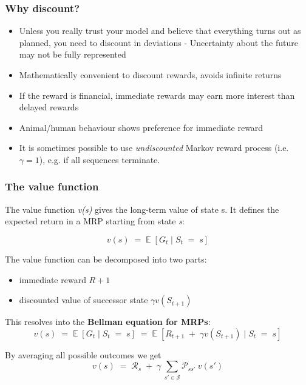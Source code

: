 \documentclass[10pt]{article}
\begin{document}
\subsubsection*{Why discount?}
\begin{itemize}
\item Unless you really trust your model and believe that everything turns out as planned, you need to discount in deviations - Uncertainty about the future may not be fully represented
\item Mathematically convenient to discount rewards, avoids infinite returns
\item If the reward is financial, immediate rewards may earn more interest than delayed rewards
\item Animal/human behaviour shows preference for immediate reward
\item It is sometimes possible to use \textit{undiscounted} Markov reward process (i.e. $\gamma = 1$), e.g. if all sequences terminate.
\end{itemize}

\subsubsection*{The value function}

The value function \textit{v(s)} gives the long-term value of state s. It defines the expected return in a MRP starting from state \textit{s}:

\begin{equation}
v(s) \; = \; \mathbb{E}\;[G_{t} \; | \; S_{t} \; = \; s]
\end{equation}

The value function can be decomposed into two parts:

\begin{itemize}
\item immediate reward $R+1$
\item discounted value of successor state $\gamma v(S_{t+1})$
\end{itemize}

This resolves into the \textbf{Bellman equation for MRPs}:
\begin{equation}
v(s) \; = \; \mathbb{E}\;[G_{t} \; | \; S_{t} \; = \; s] \; = \; \mathbb{E}\;[R_{t+1} \; + \; \gamma v(S_{t+1}) \; | \; S_{t} \; = \; s]
\end{equation}

By averaging all possible outcomes we get
\begin{equation}
v(s) \; = \; \mathcal{R}_{s} \; + \; \gamma \: \sum_{s' \in \mathcal{S}} \mathcal{P}_{ss'}\:v(s')
 \label{eq:averaging_mrp}
\end{equation}
\end{document}
